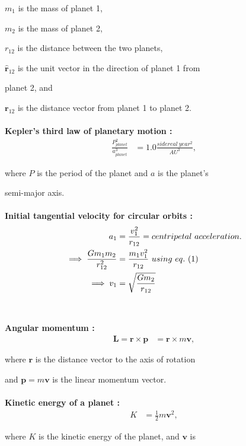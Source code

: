 \documentclass{article}%
\begin{document}
$m_1$ is the mass of planet 1, 

$m_2$ is the mass of planet 2, 

${r_{12}}$ is the distance between the two planets, 

$\mathbf{\hat{r}}_{12}$ is the unit vector in the direction of planet 1 from 

planet 2, and 

$\mathbf{r}_{12}$ is the distance vector from planet 1 to planet 2.\\
\\
\textbf{Kepler's third law of planetary motion :}
\begin{align}
	\frac{P_{planet}^2}{a_{planet}^3} & = 1.0 \frac{sidereal\ year^2}{AU^3},
\end{align}

where $P$ is the period of the planet and $a$ is the planet's 

semi-major axis.\\
\\
\textbf{Initial tangential velocity for circular orbits :}
\begin{align}
	a_1 &= \frac{v_1^2}{r_{12}} = centripetal\ acceleration.\notag \\
	\implies \frac{Gm_1m_2}{r_{12}^2} &= \frac{m_1v_1^2}{r_{12}} \ using\ eq.\ (1)\ \notag \\
	\implies v_1 &= \sqrt{Gm_2 \over r_{12}}
\end{align}\\
\\
\textbf{Angular momentum :}
\begin{align}
	\mathbf{L}=\mathbf{r}\times\mathbf{p} &= \mathbf{r}\times m \mathbf{v},
\end{align}

where $\mathbf{r}$ is the distance vector to the axis of rotation 

and $\mathbf{p} = m \mathbf{v}$ is the linear momentum vector.\\
\\
\textbf{Kinetic energy of a planet :}
\begin{align}
	K &= \frac{1}{2}m\mathbf{v}^2,
\end{align}

where $K$ is the kinetic energy of the planet, and $\mathbf{v}$ is 
\end{document}
